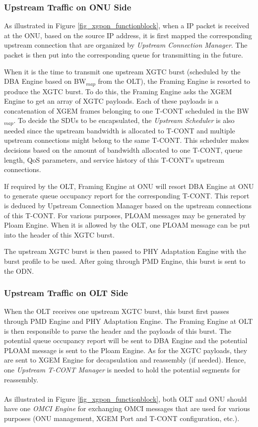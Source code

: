 \subsubsection{Upstream Traffic on ONU Side}

As illustrated in Figure \ref{fig_xgpon_functionblock}, when a IP
packet is received at the ONU, based on the source IP address,
it is first mapped the corresponding upstream connection
that are organized by \emph{Upstream Connection Manager}.
The packet is then put into the corresponding queue for
transmitting in the future.

When it is the time to transmit one upstream XGTC burst (scheduled
by the DBA Engine based on BW$_{map}$ from the OLT), the Framing
Engine is resorted to produce the XGTC burst. To do this, the
Framing Engine asks the XGEM Engine to get an array of XGTC
payloads. Each of these payloads is a concatenation of XGEM frames
belonging to one T-CONT scheduled in the BW$_{map}$. To decide the
SDUs to be encapsulated, the \emph{Upstream Scheduler} is also
needed since the upstream bandwidth is allocated to T-CONT and
multiple upstream connections might belong to the same T-CONT.
This scheduler makes decisions based on the amount of bandwidth
allocated to one T-CONT, queue length, QoS parameters, and service
history of this T-CONT's upstream connections.


If required by the OLT, Framing Engine at ONU will resort DBA
Engine at ONU to generate queue occupancy report for the
corresponding T-CONT. This report is deduced by Upstream
Connection Manager based on the upstream connections of this
T-CONT. For various purposes, PLOAM messages may be generated by
Ploam Engine. When it is allowed by the OLT, one PLOAM message can
be put into the header of this XGTC burst.

The upstream XGTC burst is then passed to PHY Adaptation Engine
with the burst profile to be used. After going through PMD Engine,
this burst is sent to the ODN.



\subsubsection{Upstream Traffic on OLT Side}

When the OLT receives one upstream XGTC burst, this burst first
passes through PMD Engine and PHY Adaptation Engine. The Framing
Engine at OLT is then responsible to parse the header and the
payloads of this burst. The potential queue occupancy report will
be sent to DBA Engine and the potential PLOAM message is sent to
the Ploam Engine. As for the XGTC payloads, they are sent to XGEM
Engine for decapsulation and reassembly (if needed). Hence, one
\emph{Upstream T-CONT Manager} is needed to hold the potential
segments for reassembly.
\\
\\
As illustrated in Figure \ref{fig_xgpon_functionblock}, both OLT
and ONU should have one \emph{OMCI Engine} for exchanging OMCI
messages that are used for various purposes (ONU management, XGEM
Port and T-CONT configuration, etc.).

